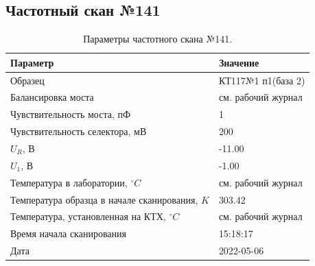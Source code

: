 \subsection{Частотный скан №141}
\begin{table}[!ht]
    \centering
    \caption{Параметры частотного скана №141.}
    \begin{tabular}{|l|l|}
        \hline
        Параметр                                       & Значение                  \\ \hline
        Образец                                        & КТ117№1 п1(база 2)        \\ \hline
        Балансировка моста                             & см. рабочий журнал        \\ \hline
        Чувствительность моста, пФ                     & 1                         \\ \hline
        Чувствительность селектора, мВ                 & 200                       \\ \hline
        $U_R$, В                                       & -11.00                    \\ \hline
        $U_1$, В                                       & -1.00                     \\ \hline
        Температура в лаборатории, $^\circ C$          & см. рабочий журнал        \\ \hline
        Температура образца в начале сканирования, $K$ & 303.42                    \\ \hline
        Температура, установленная на КТХ, $^\circ C$  & см. рабочий журнал        \\ \hline
        Время начала сканирования                      & 15:18:17                  \\ \hline
        Дата                                           & 2022-05-06                \\ \hline
    \end{tabular}
    \label{table:frequency_scan_141}
\end{table}

